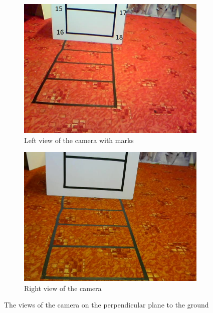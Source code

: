 \begin{figure}
\centering
\begin{subfigure}{0.48\linewidth}
	\includegraphics[width=\linewidth]{img/experiments/table-left.jpg}
	\caption{Left view of the camera with marks}
	\label{fig:tablenumbered}
\end{subfigure}
\begin{subfigure}{0.48\linewidth}
	\includegraphics[width=\linewidth]{img/experiments/table-right.jpg}
	\caption{Right view of the camera}
\end{subfigure}
\caption{The views of the camera on the perpendicular plane to the ground}
\label{fig:table}
\end{figure}

